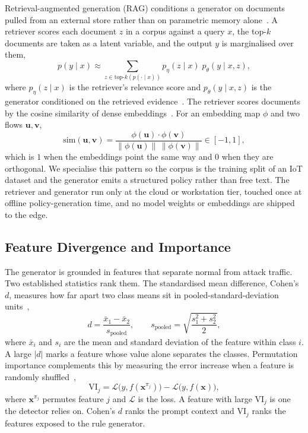 Retrieval-augmented generation (RAG) conditions a generator on documents
pulled from an external store rather than on parametric memory
alone~\cite{lewis2020rag}. A retriever scores each document $z$ in a corpus
against a query $x$, the top-$k$ documents are taken as a latent variable,
and the output $y$ is marginalised over them,
\begin{equation}
  p(y \mid x) \approx
    \sum_{z \in \text{top-}k(p(\cdot \mid x))}
      p_\eta(z \mid x) \; p_\theta(y \mid x, z),
  \label{eq:rag}
\end{equation}
where $p_\eta(z \mid x)$ is the retriever's relevance score and
$p_\theta(y \mid x, z)$ is the generator conditioned on the retrieved
evidence~\cite{lewis2020rag}. The retriever scores documents by the cosine
similarity of dense embeddings~\cite{reimers2019sbert,song2020mpnet}. For an
embedding map $\phi$ and two flows $\mathbf{u},\mathbf{v}$,
\begin{equation}
  \mathrm{sim}(\mathbf{u}, \mathbf{v})
  = \frac{\phi(\mathbf{u}) \cdot \phi(\mathbf{v})}
         {\lVert \phi(\mathbf{u}) \rVert \, \lVert \phi(\mathbf{v}) \rVert}
  \in [-1, 1],
  \label{eq:cosine}
\end{equation}
which is $1$ when the embeddings point the same way and $0$ when they are
orthogonal. We specialise this pattern so the corpus is the training split
of an IoT dataset and the generator emits a structured policy rather than
free text. The retriever and generator run only at the cloud or workstation
tier, touched once at offline policy-generation time, and no model weights or
embeddings are shipped to the edge.

\subsection{Feature Divergence and Importance}
\label{subsec:featurestats}

The generator is grounded in features that separate normal from attack
traffic. Two established statistics rank them. The standardised mean
difference, Cohen's $d$, measures how far apart two class means sit in
pooled-standard-deviation units~\cite{cohen1988power},
\begin{equation}
  d = \frac{\bar{x}_1 - \bar{x}_2}{s_{\text{pooled}}},
  \qquad
  s_{\text{pooled}} = \sqrt{\frac{s_1^2 + s_2^2}{2}},
  \label{eq:cohend}
\end{equation}
where $\bar{x}_i$ and $s_i$ are the mean and standard deviation of the
feature within class $i$. A large $|d|$ marks a feature whose value alone
separates the classes. Permutation importance complements this by measuring
the error increase when a feature is randomly shuffled~\cite{breiman2001randomforests},
\begin{equation}
  \mathrm{VI}_j = \mathcal{L}\bigl(y, f(\mathbf{x}^{\pi_j})\bigr)
                - \mathcal{L}\bigl(y, f(\mathbf{x})\bigr),
  \label{eq:permimp}
\end{equation}
where $\mathbf{x}^{\pi_j}$ permutes feature $j$ and $\mathcal{L}$ is the loss.
A feature with large $\mathrm{VI}_j$ is one the detector relies on. Cohen's
$d$ ranks the prompt context and $\mathrm{VI}_j$ ranks the features exposed
to the rule generator.

